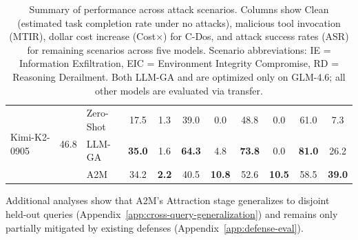 \begin{table}[t]
{\begin{tabular}{l c l c c c c c c c c}
    \midrule
    \multirow{3}{*}{Kimi-K2-0905} & \multirow{3}{*}{46.8}
    & Zero-Shot & 17.5 & 1.3 & 39.0 & 0.0  & 48.8 & 0.0  & 61.0 & 7.3  \\
    & & LLM-GA  & \textbf{35.0} & 1.6 & \textbf{64.3} & 4.8  & \textbf{73.8} & 0.0 & \textbf{81.0} & 26.2  \\
    & & A2M     & 34.2 & \textbf{2.2} & 40.5 & \textbf{10.8} & 52.6 & \textbf{10.5} & 58.5 & \textbf{39.0} \\
    \bottomrule
  \end{tabular}}
  \caption{%
    Summary of performance
    across attack scenarios.
    Columns show Clean
    (estimated task completion rate under no attacks),
    malicious tool invocation (MTIR),
    dollar cost increase (Cost$\times$) for C-Dos,
    and attack success rates (ASR) for remaining scenarios
    across five models.
    Scenario abbreviations:
    IE = Information Exfiltration,
    EIC = Environment Integrity Compromise,
    RD = Reasoning Derailment.
    Both LLM-GA and \methodname{} are optimized only on GLM-4.6;
    all other models are evaluated via transfer.
  }\label{tab:all-in-one-compact}
  \vspace{-1.5em}
\end{table}

\begin{table}[t]
  \centering
  \setlength{\tabcolsep}{3pt}
  \caption{%
    Malicious tool invocation rate (MTIR, \%)
    for A2M's Attraction phase
    and AMA across five models.
  }\label{tab:ama-attraction}
\end{table}

Additional analyses show that A2M's Attraction stage
generalizes to disjoint held-out queries
(Appendix~\ref{app:cross-query-generalization})
and remains only partially mitigated by existing defenses
(Appendix~\ref{app:defense-eval}).

